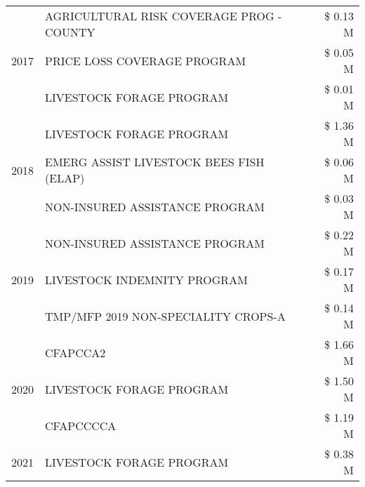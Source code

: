 \begin{tabular}{llr}
\cline{1-3}
\multirow[t]{3}{*}{2017} & AGRICULTURAL RISK COVERAGE PROG - COUNTY & \$ 0.13 M \\
 & PRICE LOSS COVERAGE PROGRAM & \$ 0.05 M \\
 & LIVESTOCK FORAGE PROGRAM & \$ 0.01 M \\
\cline{1-3}
\multirow[t]{3}{*}{2018} & LIVESTOCK FORAGE PROGRAM & \$ 1.36 M \\
 & EMERG ASSIST LIVESTOCK BEES FISH (ELAP) & \$ 0.06 M \\
 & NON-INSURED ASSISTANCE PROGRAM & \$ 0.03 M \\
\cline{1-3}
\multirow[t]{3}{*}{2019} & NON-INSURED ASSISTANCE PROGRAM & \$ 0.22 M \\
 & LIVESTOCK INDEMNITY PROGRAM & \$ 0.17 M \\
 & TMP/MFP 2019 NON-SPECIALITY CROPS-A & \$ 0.14 M \\
\cline{1-3}
\multirow[t]{3}{*}{2020} & CFAPCCA2 & \$ 1.66 M \\
 & LIVESTOCK FORAGE PROGRAM & \$ 1.50 M \\
 & CFAPCCCCA & \$ 1.19 M \\
\cline{1-3}
2021 & LIVESTOCK FORAGE PROGRAM & \$ 0.38 M \\
\cline{1-3}
\bottomrule
\end{tabular}
